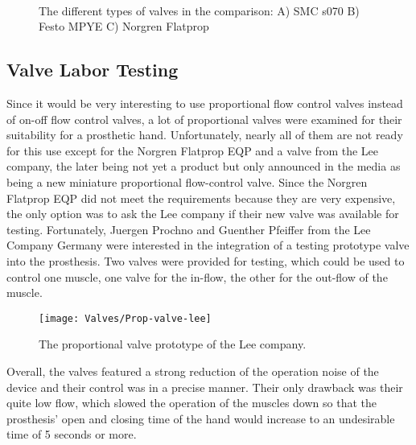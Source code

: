 \documentclass[main]{subfiles}
\begin{document}
\begin{figure}[H]
\centering
{}\hspace{0.1\textwidth}
\hspace{0.1\textwidth}
\\
\caption[Valve types]{The different types of valves in the comparison:
A) SMC s070 B) Festo MPYE C) Norgren Flatprop}
\end{figure}

\subsection{Valve Labor Testing}

Since it would be very interesting to use proportional flow control valves instead of on-off flow control valves, a lot of proportional valves were examined for their suitability for a prosthetic hand. Unfortunately, nearly all of them are not ready for this use except for the Norgren Flatprop EQP and a valve from the Lee company, the later being not yet a product but only announced in the media as being a new miniature proportional flow-control valve. Since the Norgren Flatprop EQP did not meet the requirements because they are very expensive, the only option was to ask the Lee company if their new valve was available for testing. Fortunately, Juergen Prochno and Guenther Pfeiffer from the Lee Company Germany were interested in the integration of a testing prototype valve into the prosthesis. Two valves were provided for testing, which could be used to control one muscle, one valve for the in-flow, the other for the out-flow of the muscle. 

\begin{figure}[H]
\centering
\texttt{[image: Valves/Prop-valve-lee]}
\caption[Lee company prototype]{The proportional valve prototype of the Lee company.}
\label{prop-valve-lee}
\end{figure}

Overall, the valves featured a strong reduction of the operation noise of the device and their control was in a precise manner. Their only drawback was their quite low flow, which slowed the operation of the muscles down so that the prosthesis' open and closing time of the hand would increase to an undesirable time of 5 seconds or more.
\end{document}
